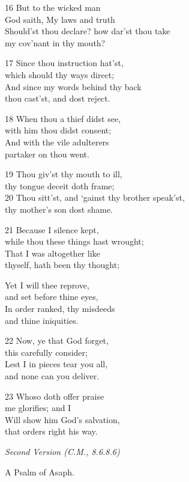 \begin{multicols}{3}
16 But to the wicked man\\
God saith, My laws and truth\\
Should’st thou declare? how dar’st thou take\\
my cov’nant in thy mouth?

17 Since thou instruction hat’st,\\
which should thy ways direct;\\
And since my words behind thy back\\
thou cast’st, and dost reject.

18 When thou a thief didst see,\\
with him thou didst consent;\\
And with the vile adulterers\\
partaker on thou went.

19 Thou giv’st thy mouth to ill,\\
thy tongue deceit doth frame;\\
20 Thou sitt’st, and ‘gainst thy brother speak’st,\\
thy mother’s son dost shame.

21 Because I silence kept,\\
while thou these things hast wrought;\\
That I was altogether like\\
thyself, hath been thy thought;

Yet I will thee reprove,\\
and set before thine eyes,\\
In order ranked, thy misdeeds\\
and thine iniquities.

22 Now, ye that God forget,\\
this carefully consider;\\
Lest I in pieces tear you all,\\
and none can you deliver.

23 Whoso doth offer praise\\
me glorifies; and I\\
Will show him God’s salvation,\\
that orders right his way.

\begin{center}
\quad{}\quad{}
\end{center}

\emph{Second Version (C.M., 8.6.8.6)}

A Psalm of Asaph.


\end{multicols}
